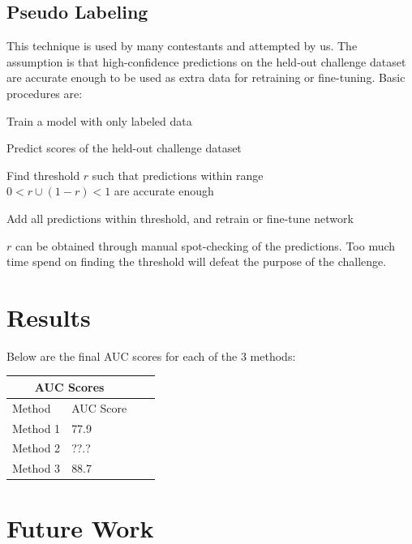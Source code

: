 \documentclass[10pt,twocolumn,letterpaper]{article}
\newenvironment{alt_enumerate}
{ \begin{enumerate}
		\setlength{\itemsep}{1pt}
		\setlength{\parskip}{1pt}
		\setlength{\parsep}{1pt} }
	{ \end{enumerate} }
\begin{document}
\subsection{Pseudo Labeling}

This technique is used by many contestants and attempted by us. The
assumption is that high-confidence predictions on the held-out challenge
dataset are accurate enough to be used as extra data for retraining or
fine-tuning. Basic procedures are:

\begin{alt_enumerate}
	\item{Train a model with only labeled data}
	\item{Predict scores of the held-out challenge dataset}
	\item{Find threshold \(r\) such that predictions within range\\
		\(0<r \cup (1-r)<1\) are accurate enough}
	\item{Add all predictions within threshold, and retrain or fine-tune
		network}
\end{alt_enumerate}

\(r\) can be obtained through manual spot-checking of the predictions. Too
much time spend on finding the threshold will defeat the purpose of the
challenge.

\section{Results}

Below are the final AUC scores for each of the 3 methods:\\

\begin{tabular}{ |p{2cm}|p{2cm}|p{2cm}|p{2cm}| }
	\hline
	\multicolumn{2}{|c|}{AUC Scores}\\
	\hline
	Method & AUC Score\\
	\hline
	Method 1 & 77.9\\
	Method 2 & ??.?\\
	Method 3 & 88.7\\
	\hline
\end{tabular}

\section{Future Work}
\end{document}
